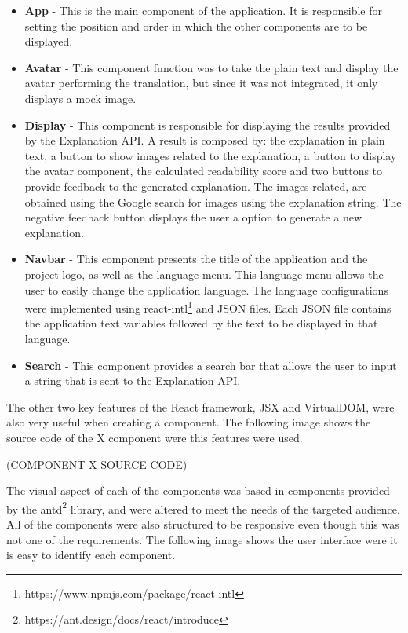 \begin{itemize}
    \item \textbf{App} - This is the main component of the application.
        It is responsible for setting the position and order in which the other components are to be displayed.
    \item \textbf{Avatar} - This component function was to take the plain text and display the avatar performing the translation, but since it was not integrated, it only displays a mock image.
    \item \textbf{Display} - This component is responsible for displaying the results provided by the Explanation API.
        A result is composed by: the explanation in plain text, a button to show images related to the explanation, a button to display the avatar component, the calculated readability score and two buttons to provide feedback to the generated explanation.
        The images related, are obtained using the Google search for images using the explanation string.
        The negative feedback button displays the user a option to generate a new explanation.
    \item \textbf{Navbar} - This component presents the title of the application and the project logo, as well as the language menu.
        This language menu allows the user to easily change the application language.
        The language configurations were implemented using react-intl\footnote{https://www.npmjs.com/package/react-intl} and JSON files.
        Each JSON file contains the application text variables followed by the text to be displayed in that language.
    \item \textbf{Search} - This component provides a search bar that allows the user to input a string that is sent to the Explanation API.
\end{itemize}

The other two key features of the React framework, JSX and VirtualDOM, were also very useful when creating a component.
The following image shows the source code of the X component were this features were used. %

(COMPONENT X SOURCE CODE) %

The visual aspect of each of the components was based in components provided by the antd\footnote{https://ant.design/docs/react/introduce} library, and were altered to meet the needs of the targeted audience.
All of the components were also structured to be responsive even though this was not one of the requirements.
The following image shows the user interface were it is easy to identify each component.

